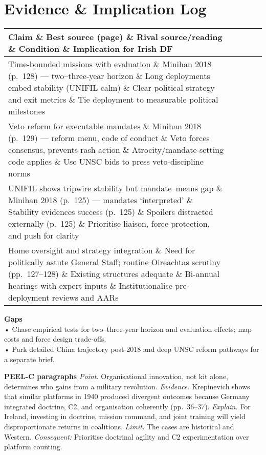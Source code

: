 \section*{Evidence \& Implication Log}  
\begin{tabular}{p{3.2cm}p{4.2cm}p{3.6cm}p{3.2cm}p{4.2cm}}  
	\textbf{Claim} \& \textbf{Best source (page)} \& \textbf{Rival source/reading} \& \textbf{Condition} \& \textbf{Implication for Irish DF}\\\hline  
	Time-bounded missions with evaluation \& Minihan 2018 (p.~128) — two–three-year horizon \& Long deployments embed stability (UNIFIL calm) \& Clear political strategy and exit metrics \& Tie deployment to measurable political milestones\\  
	Veto reform for executable mandates \& Minihan 2018 (p.~129) — reform menu, code of conduct \& Veto forces consensus, prevents rash action \& Atrocity/mandate-setting code applies \& Use UNSC bids to press veto-discipline norms\\  
	UNIFIL shows tripwire stability but mandate–means gap \& Minihan 2018 (p.~125) — mandates ‘interpreted’ \& Stability evidences success (p.~125) \& Spoilers distracted externally (p.~125) \& Prioritise liaison, force protection, and push for clarity\\  
	Home oversight and strategy integration \& Need for politically astute General Staff; routine Oireachtas scrutiny (pp.~127–128) \& Existing structures adequate \& Bi-annual hearings with expert inputs \& Institutionalise pre-deployment reviews and AARs\\  
\end{tabular}  

\textbf{Gaps}\\  
• Chase empirical tests for two–three-year horizon and evaluation effects; map costs and force design trade-offs.\\  
• Park detailed China trajectory post-2018 and deep UNSC reform pathways for a separate brief.  

\parencite{NYE_2008}

\textbf{PEEL-C paragraphs}  
\textit{Point.} Organisational innovation, not kit alone, determines who gains from a military revolution.  
\textit{Evidence.} Krepinevich shows that similar platforms in 1940 produced divergent outcomes because Germany integrated doctrine, C2, and organisation coherently (pp.~36--37).  
\textit{Explain.} For Ireland, investing in doctrine, mission command, and joint training will yield disproportionate returns in coalitions.  
\textit{Limit.} The cases are historical and Western.  
\textit{Consequent:} Prioritise doctrinal agility and C2 experimentation over platform counting.  

